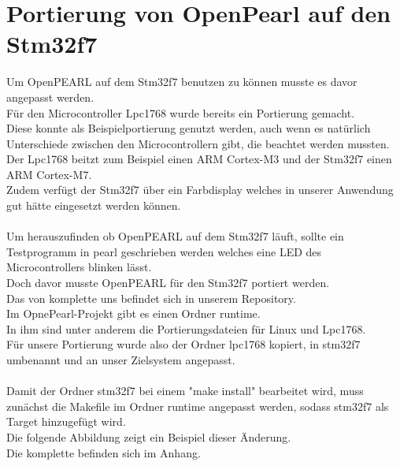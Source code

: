 \chapter{Portierung von OpenPearl auf den Stm32f7}
Um OpenPEARL auf dem Stm32f7 benutzen zu können musste es davor angepasst werden.\\
Für den Microcontroller Lpc1768 wurde bereits ein Portierung gemacht.\\
Diese konnte als Beispielportierung genutzt werden, auch wenn es natürlich Unterschiede zwischen den Microcontrollern gibt, die beachtet werden mussten.\\
Der Lpc1768 beitzt zum Beispiel einen ARM Cortex-M3 und der Stm32f7 einen ARM Cortex-M7.\\
Zudem verfügt der Stm32f7 über ein Farbdisplay welches in unserer Anwendung gut hätte eingesetzt werden können.\\
\\
Um herauszufinden ob OpenPEARL auf dem Stm32f7 läuft, sollte ein Testprogramm in pearl geschrieben werden welches eine LED des Microcontrollers blinken lässt.\\
Doch davor musste OpenPEARL für den Stm32f7 portiert werden.\\
Das von komplette uns  befindet sich in unserem Repository.\\
Im OpnePearl-Projekt gibt es einen Ordner runtime.\\
In ihm sind unter anderem die Portierungsdateien für Linux und Lpc1768.\\
Für unsere Portierung wurde also der Ordner lpc1768 kopiert, in stm32f7 umbenannt und an unser Zielsystem angepasst.\\
\\
Damit der Ordner stm32f7 bei einem "make install" bearbeitet wird, muss zunächst die Makefile im Ordner runtime angepasst werden, sodass stm32f7 als Target hinzugefügt wird.\\
Die folgende Abbildung zeigt ein Beispiel dieser Änderung.\\
Die komplette  befinden sich im Anhang.\\
